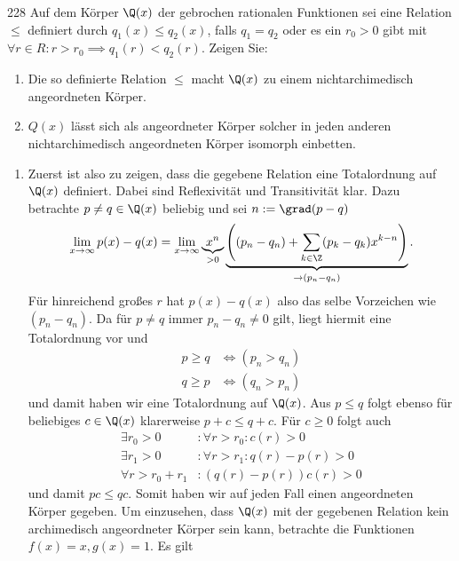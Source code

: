 \begin{algebraUE}{228}
Auf dem Körper $\Q(x)$ der gebrochen rationalen Funktionen sei eine Relation $\leq$
definiert durch $q_1(x) \leq q_2(x)$, falls $q_1 = q_2$ oder es ein $r_0 > 0$ gibt
mit $\forall r \in R: r > r_0 \implies q_1(r) < q_2(r)$. Zeigen Sie:
\begin{enumerate}
  \item Die so definierte Relation $\leq$ macht $\Q(x)$ zu einem nichtarchimedisch
  angeordneten Körper.
  \item $Q(x)$ lässt sich als angeordneter Körper solcher in jeden anderen
  nichtarchimedisch angeordneten Körper isomorph einbetten.
\end{enumerate}
\end{algebraUE}
\begin{solution}
\begin{enumerate}
  \item Zuerst ist also zu zeigen, dass die gegebene Relation eine Totalordnung
  auf $\Q(x)$ definiert.
  Dabei sind Reflexivität und Transitivität klar.
  Dazu betrachte $p \neq q \in \Q(x)$ beliebig und sei $n := \grad(p - q)$
  \begin{align*}
    \lim_{x \to \infty} p(x) - q(x) = \lim_{x \to \infty}\underbrace{x^n}_{> 0}
    \underbrace{\left((p_n - q_n) + \sum_{k \in \Z}(p_k - q_k)x^{k-n}\right)}_{\to (p_n - q_n)}.
  \end{align*}
  Für hinreichend großes $r$ hat $p(x) - q(x)$ also das selbe Vorzeichen wie $(p_n - q_n)$.
  Da für $p \neq q$ immer $p_n - q_n \neq 0$ gilt, liegt hiermit eine Totalordnung vor und
  \begin{align*}
    p \geq q &\iff (p_n > q_n) \\
    q \geq p &\iff (q_n > p_n)
  \end{align*}
  und damit haben wir eine Totalordnung auf $\Q(x)$.
  Aus $p \leq q$ folgt ebenso für beliebiges $c \in \Q(x)$ klarerweise $p + c \leq q + c$.
  Für $c \geq 0$ folgt auch
  \begin{align*}
    \exists r_0 > 0&: \forall r > r_0: c(r) > 0 \\
    \exists r_1 > 0&: \forall r > r_1: q(r) - p(r) > 0 \\
    \forall r > r_0 + r_1&: (q(r) - p(r))c(r) > 0
  \end{align*}
  und damit $pc \leq qc$. Somit haben wir auf jeden Fall einen angeordneten Körper
  gegeben.
  Um einzusehen, dass $\Q(x)$ mit der gegebenen Relation kein archimedisch angeordneter
  Körper sein kann, betrachte die Funktionen $f(x) = x, g(x) = 1$. Es gilt

\end{enumerate}
\end{solution}
